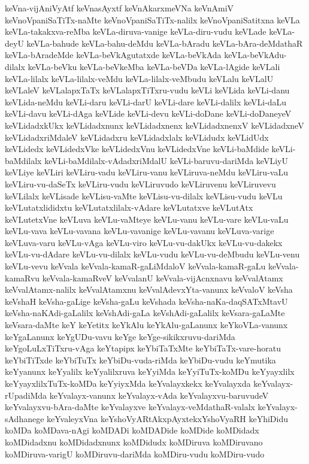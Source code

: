 {keVna-vijAniVyAtf
keVnasAyxtf
keVnAkarxmeVNa
keVnAmiV
keVnoVpaniSaTiTx-naMte
keVnoVpaniSaTiTx-nalilx
keVnoVpaniSatitxna
keVLa
keVLa-takakxva-reMba
keVLa-diruva-vanige
keVLa-diru-vudu
keVLade
keVLa-deyU
keVLa-bahude
keVLa-bahu-deMdu
keVLa-bAradu
keVLa-bAra-deMdathaR
keVLa-bAradeMde
keVLa-beVkAgutatxde
keVLa-beVkAda
keVLa-beVkAdu-dilalx
keVLa-beVku
keVLa-beVkeMba
keVLa-beVDa
keVLa-lAgide
keVLali
keVLa-lilalx
keVLa-lilalx-veMdu
keVLa-lilalx-veMbudu
keVLalu
keVLalU
keVLaleV
keVLalapxTaTx
keVLalapxTiTxru-vudu
keVLi
keVLida
keVLi-danu
keVLida-neMdu
keVLi-daru
keVLi-darU
keVLi-dare
keVLi-dalilx
keVLi-daLu
keVLi-davu
keVLi-dAga
keVLide
keVLi-devu
keVLi-doDane
keVLi-doDaneyeV
keVLidadxkUkx
keVLidadxnunx
keVLidadxnenx
keVLidadxnenxV
keVLidadxneV
keVLidadxriMdaleV
keVLidadxru
keVLidadxlalx
keVLidudx
keVLidUdx
keVLidedx
keVLidedxVke
keVLidedxVnu
keVLidedxVne
keVLi-baMdide
keVLi-baMdilalx
keVLi-baMdilalx-vAdadxriMdalU
keVLi-baruvu-dariMda
keVLiyU
keVLiye
keVLiri
keVLiru-vadu
keVLiru-vanu
keVLiruva-neMdu
keVLiru-vaLu
keVLiru-vu-daSeTx
keVLiru-vudu
keVLiruvudo
keVLiruvenu
keVLiruvevu
keVLilalx
keVLisade
keVLisu-vaMte
keVLisu-vu-dilalx
keVLisu-vudu
keVLu
keVLutatxlididxtu
keVLutatxlilalx-vAdare
keVLutatxve
keVLutAtx
keVLutetxVne
keVLuva
keVLu-vaMteye
keVLu-vanu
keVLu-vare
keVLu-vaLu
keVLu-vava
keVLu-vavana
keVLu-vavanige
keVLu-vavanu
keVLuva-varige
keVLuva-varu
keVLu-vAga
keVLu-viro
keVLu-vu-dakUkx
keVLu-vu-dakekx
keVLu-vu-dAdare
keVLu-vu-dilalx
keVLu-vudu
keVLu-vu-deMbudu
keVLu-venu
keVLu-vevu
keVvala
keVvala-kamaR-gaLiMdaloV
keVvala-kamaR-gaLu
keVvala-kamaRvu
keVvala-kamaRveV
keVvalanU
keVvala-vijAcnxnavu
keVvalAtamx
keVvalAtamx-nalilx
keVvalAtamxnu
keVvalAdevxYta-vanunx
keVvaloV
keVsha
keVshaH
keVsha-gaLige
keVsha-gaLu
keVshada
keVsha-naKa-daqSATxMtavU
keVsha-naKAdi-gaLalilx
keVshAdi-gaLa
keVshAdi-gaLalilx
keVsara-gaLaMte
keVsara-daMte
keY
keYetitx
keYkAlu
keYkAlu-gaLanunx
keYkoVLa-vanunx
keYgaLanunx
keYgUDu-vavu
keYge
keYge-sikikxruvu-dariMda
keYgoLuLxTiTxru-vAga
keYtapipx
keYbiTaTxMte
keYbiTaTx-vare-horatu
keYbiTiTxde
keYbiTuTx
keYbiDu-vuda-riMda
keYbiDu-vudu
keYmutika
keYyanunx
keYyalilx
keYyalilxruva
keYyiMda
keYyiTuTx-koMDu
keYyayxlilx
keYyayxlilxTuTx-koMDa
keYyiyxMda
keYvalayxkekx
keYvalayxda
keYvalayx-rUpadiMda
keYvalayx-vanunx
keYvalayx-vAda
keYvalayxvu-baruvudeV
keYvalayxvu-bAra-daMte
keYvalayxve
keYvalayx-veMdathaR-valalx
keYvalayx-sAdhanege
keYvaleyxVna
keYshoVyARtAkxpAyxtekxYshoVyaRH
keYhiDidu
koMDa
koMDava-nAgi
koMDADi
koMDADide
koMDide
koMDidadx
koMDidadxnu
koMDidadxnunx
koMDidudx
koMDiruva
koMDiruvano
koMDiruva-varigU
koMDiruvu-dariMda
koMDiru-vudu
koMDiru-vudo
}

